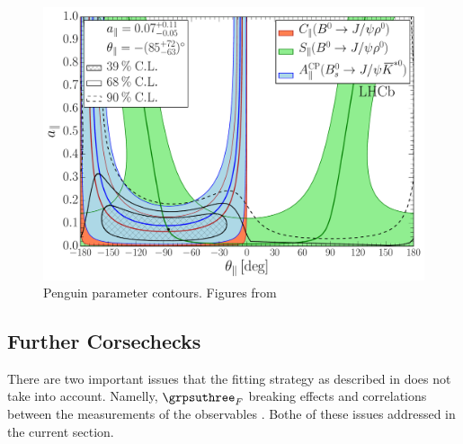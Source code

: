 \begin{figure}[h]
\begin{center}
  \includegraphics[trim=0.0cm 0.0cm 0.0cm 0.0cm, clip=true,scale=0.33]{Figures/Chapter5/Penguin_Contribution_Ang_vs_Abs_allB2VV_Para.pdf}
  \caption{Penguin parameter contours. Figures from~\cite{DeBruyn-thesis}}
  \label{pengPlot_para}
\end{center}
\end{figure}



\subsection{Further Corsechecks}
There are two important issues that the fitting strategy as described in 
does not take into account. Namelly, $\grpsuthree_F$ breaking effects and correlations between
the measurements of the observables . Bothe of these issues addressed in the current section.

